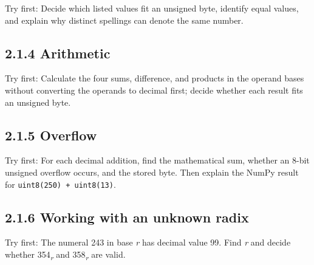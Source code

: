 \documentclass[11pt]{article}
\begin{document}
\begin{keepsection}
\begin{keepsection}
Try first: Decide which listed values fit an unsigned byte, identify equal values, and explain why distinct spellings can denote the same number.

\end{keepsection}

\begin{keepsection}
\subsection{2.1.4 Arithmetic}

Try first: Calculate the four sums, difference, and products in the operand bases without converting the operands to decimal first; decide whether each result fits an unsigned byte.

\end{keepsection}

\begin{keepsection}
\subsection{2.1.5 Overflow}

Try first: For each decimal addition, find the mathematical sum, whether an 8-bit unsigned overflow occurs, and the stored byte. Then explain the NumPy result for \texttt{uint8(250) + uint8(13)}.

\end{keepsection}

\begin{keepsection}
\subsection{2.1.6 Working with an unknown radix}

Try first: The numeral 243 in base \textit{r} has decimal value 99. Find \textit{r} and decide whether 354\textsubscript{\textit{r}} and 358\textsubscript{\textit{r}} are valid.

\end{keepsection}
\end{keepsection}
\end{document}
